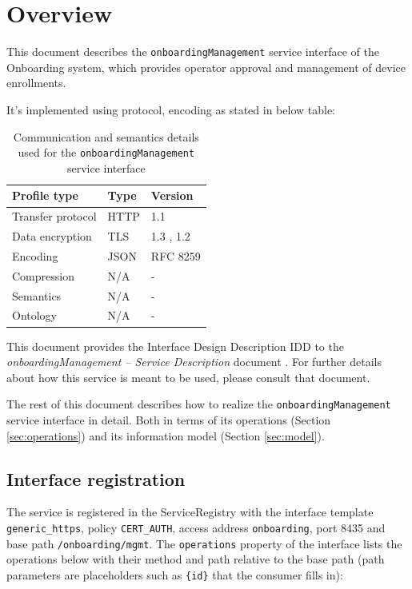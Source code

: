 \documentclass[a4paper]{arrowhead}
\begin{document}
\section{Overview}
\label{sec:overview}

This document describes the \texttt{onboarding\allowbreak{}Management} service interface of the Onboarding system, which provides operator approval and management of device enrollments.

It's implemented using protocol, encoding as stated in below table:
\begin{table}[ht!]
  \centering
  \begin{tabular}{|l|l|l|}
    \hline
    \rowcolor{gray!33} Profile type & Type & Version \\ \hline
    Transfer protocol & HTTP & 1.1 \cite{rfc9112} \\ \hline
    Data encryption & TLS & 1.3 \cite{rfc8446}, 1.2 \cite{rfc5246} \\ \hline
    Encoding & JSON & RFC 8259 \cite{rfc8259} \\ \hline
    Compression & N/A & - \\ \hline
    Semantics & N/A & - \\ \hline
    Ontology & N/A & - \\ \hline
  \end{tabular}
  \caption{Communication and semantics details used for the \texttt{onboarding\allowbreak{}Management} service interface}
  \label{tab:comunication_semantics_profile}
\end{table}

This document provides the Interface Design Description IDD to the \textit{onboardingManagement -- Service Description} document \cite{onb-onboardingManagement-sd}.
For further details about how this service is meant to be used, please consult that document.

The rest of this document describes how to realize the \texttt{onboarding\allowbreak{}Management} service
interface in detail. Both in terms of its operations (Section \ref{sec:operations}) and its information model (Section \ref{sec:model}).

\subsection{Interface registration}

The service is registered in the ServiceRegistry with the interface template \texttt{generic\_\allowbreak{}https}, policy \texttt{CERT\_\allowbreak{}AUTH}, access address \texttt{onboarding}, port 8435 and base path \texttt{/\allowbreak{}onboarding/\allowbreak{}mgmt}. The \texttt{operations} property of the interface lists the operations below with their method and path relative to the base path (path parameters are placeholders such as \texttt{\{id\}} that the consumer fills in):
\end{document}
